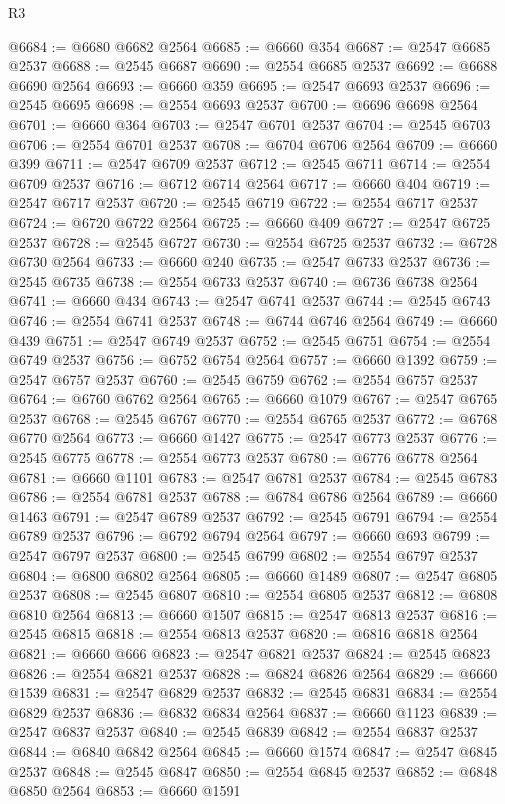 \begin{lexlean}{R3}
\begin{coremodule}
@6684 := @6680 @6682 @2564
@6685 := @6660 @354
@6687 := @2547 @6685 @2537
@6688 := @2545 @6687
@6690 := @2554 @6685 @2537
@6692 := @6688 @6690 @2564
@6693 := @6660 @359
@6695 := @2547 @6693 @2537
@6696 := @2545 @6695
@6698 := @2554 @6693 @2537
@6700 := @6696 @6698 @2564
@6701 := @6660 @364
@6703 := @2547 @6701 @2537
@6704 := @2545 @6703
@6706 := @2554 @6701 @2537
@6708 := @6704 @6706 @2564
@6709 := @6660 @399
@6711 := @2547 @6709 @2537
@6712 := @2545 @6711
@6714 := @2554 @6709 @2537
@6716 := @6712 @6714 @2564
@6717 := @6660 @404
@6719 := @2547 @6717 @2537
@6720 := @2545 @6719
@6722 := @2554 @6717 @2537
@6724 := @6720 @6722 @2564
@6725 := @6660 @409
@6727 := @2547 @6725 @2537
@6728 := @2545 @6727
@6730 := @2554 @6725 @2537
@6732 := @6728 @6730 @2564
@6733 := @6660 @240
@6735 := @2547 @6733 @2537
@6736 := @2545 @6735
@6738 := @2554 @6733 @2537
@6740 := @6736 @6738 @2564
@6741 := @6660 @434
@6743 := @2547 @6741 @2537
@6744 := @2545 @6743
@6746 := @2554 @6741 @2537
@6748 := @6744 @6746 @2564
@6749 := @6660 @439
@6751 := @2547 @6749 @2537
@6752 := @2545 @6751
@6754 := @2554 @6749 @2537
@6756 := @6752 @6754 @2564
@6757 := @6660 @1392
@6759 := @2547 @6757 @2537
@6760 := @2545 @6759
@6762 := @2554 @6757 @2537
@6764 := @6760 @6762 @2564
@6765 := @6660 @1079
@6767 := @2547 @6765 @2537
@6768 := @2545 @6767
@6770 := @2554 @6765 @2537
@6772 := @6768 @6770 @2564
@6773 := @6660 @1427
@6775 := @2547 @6773 @2537
@6776 := @2545 @6775
@6778 := @2554 @6773 @2537
@6780 := @6776 @6778 @2564
@6781 := @6660 @1101
@6783 := @2547 @6781 @2537
@6784 := @2545 @6783
@6786 := @2554 @6781 @2537
@6788 := @6784 @6786 @2564
@6789 := @6660 @1463
@6791 := @2547 @6789 @2537
@6792 := @2545 @6791
@6794 := @2554 @6789 @2537
@6796 := @6792 @6794 @2564
@6797 := @6660 @693
@6799 := @2547 @6797 @2537
@6800 := @2545 @6799
@6802 := @2554 @6797 @2537
@6804 := @6800 @6802 @2564
@6805 := @6660 @1489
@6807 := @2547 @6805 @2537
@6808 := @2545 @6807
@6810 := @2554 @6805 @2537
@6812 := @6808 @6810 @2564
@6813 := @6660 @1507
@6815 := @2547 @6813 @2537
@6816 := @2545 @6815
@6818 := @2554 @6813 @2537
@6820 := @6816 @6818 @2564
@6821 := @6660 @666
@6823 := @2547 @6821 @2537
@6824 := @2545 @6823
@6826 := @2554 @6821 @2537
@6828 := @6824 @6826 @2564
@6829 := @6660 @1539
@6831 := @2547 @6829 @2537
@6832 := @2545 @6831
@6834 := @2554 @6829 @2537
@6836 := @6832 @6834 @2564
@6837 := @6660 @1123
@6839 := @2547 @6837 @2537
@6840 := @2545 @6839
@6842 := @2554 @6837 @2537
@6844 := @6840 @6842 @2564
@6845 := @6660 @1574
@6847 := @2547 @6845 @2537
@6848 := @2545 @6847
@6850 := @2554 @6845 @2537
@6852 := @6848 @6850 @2564
@6853 := @6660 @1591

\end{coremodule}
\end{lexlean}
